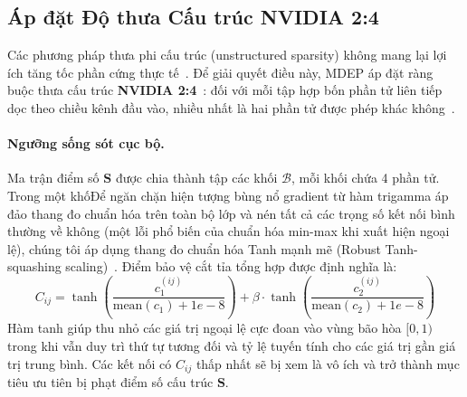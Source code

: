 \documentclass[11pt, a4paper]{article}
\begin{document}
\subsection{Áp đặt Độ thưa Cấu trúc NVIDIA 2:4}\label{subsec:nvidia24}

Các phương pháp thưa phi cấu trúc (unstructured sparsity) không mang lại lợi ích tăng tốc phần cứng thực tế~\cite{hoefler2021sparsity}. Để giải quyết điều này, MDEP áp đặt ràng buộc thưa cấu trúc \textbf{NVIDIA 2:4}~\cite{mishra2021accelerating, nvidia2020a100}: đối với mỗi tập hợp bốn phần tử liên tiếp dọc theo chiều kênh đầu vào, nhiều nhất là hai phần tử được phép khác không~\cite{zhou2021learning, hubara2021accelerated}.

\paragraph{Ngưỡng sống sót cục bộ.}
Ma trận điểm số $\bm{S}$ được chia thành tập các khối $\mathcal{B}$, mỗi khối chứa 4 phần tử. Trong một khốĐể ngăn chặn hiện tượng bùng nổ gradient từ hàm trigamma áp đảo thang đo chuẩn hóa trên toàn bộ lớp và nén tất cả các trọng số kết nối bình thường về không (một lỗi phổ biến của chuẩn hóa min-max khi xuất hiện ngoại lệ), chúng tôi áp dụng thang đo chuẩn hóa Tanh mạnh mẽ (Robust Tanh-squashing scaling)~\cite{jain2005score}. Điểm bảo vệ cắt tỉa tổng hợp được định nghĩa là:
\begin{equation}\label{eq:C_ij}
    C_{ij} = \tanh\!\left(\frac{c_1^{(ij)}}{\text{mean}(c_1) + 1e-8}\right) + \beta \cdot \tanh\!\left(\frac{c_2^{(ij)}}{\text{mean}(c_2) + 1e-8}\right)
\end{equation}
Hàm tanh giúp thu nhỏ các giá trị ngoại lệ cực đoan vào vùng bão hòa $[0, 1)$ trong khi vẫn duy trì thứ tự tương đối và tỷ lệ tuyến tính cho các giá trị gần giá trị trung bình. Các kết nối có $C_{ij}$ thấp nhất sẽ bị xem là vô ích và trở thành mục tiêu ưu tiên bị phạt điểm số cấu trúc $\bm{S}$.
\end{document}
